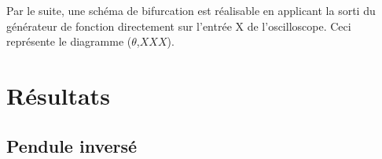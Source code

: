 \documentclass[a4paper,12pt,oneside]{article}
\begin{document}
Par le suite, une schéma de bifurcation est réalisable en applicant la sorti du générateur de fonction directement sur l'entrée X de l'oscilloscope. Ceci représente le diagramme ($\theta$,$XXX$).%

\section{Résultats}

\subsection{Pendule inversé}

\end{document}
